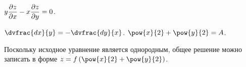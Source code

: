 \documentclass[a5paper,10pt]{article}
\begin{document}
    $y \dfrac{\partial z}{\partial x} - x \dfrac{\partial z}{\partial y} = 0$.

    $\dvfrac {d x} {y} = -\dvfrac {d y} {x}$.
    $\pow{x}{2} + \pow{y}{2} = A$.
    
    Поскольку исходное уравнение является однородным, общее решение можно записать
    в форме
    $z = f\br{\pow{x}{2} + \pow{y}{2}}$.
\end{document}
